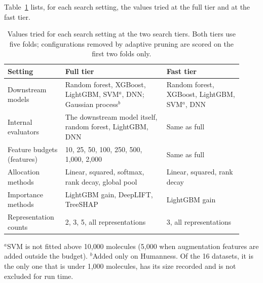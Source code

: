 Table~\ref{tab:search_tiers} lists, for each search setting, the values tried at the full tier and at the fast tier.

\begin{table}[htbp]
\centering
\caption{Values tried for each search setting at the two search tiers. Both tiers use five folds; configurations removed by adaptive pruning are scored on the first two folds only.}
\label{tab:search_tiers}
\begin{tabular}{@{}p{0.22\linewidth}p{0.40\linewidth}p{0.30\linewidth}@{}}
\toprule
Setting & Full tier & Fast tier \\
\midrule
Downstream models & Random forest, XGBoost, LightGBM, SVM$^{a}$, DNN; Gaussian process$^{b}$ & Random forest, XGBoost, LightGBM, SVM$^{a}$, DNN \\
Internal evaluators & The downstream model itself, random forest, LightGBM, DNN & Same as full \\
Feature budgets (features) & 10, 25, 50, 100, 250, 500, 1{,}000, 2{,}000 & Same as full \\
Allocation methods & Linear, squared, softmax, rank decay, global pool & Linear, squared, rank decay \\
Importance methods & LightGBM gain, DeepLIFT, TreeSHAP & LightGBM gain \\
Representation counts & 2, 3, 5, all representations & 3, all representations \\
\bottomrule
\end{tabular}

\smallskip
{\footnotesize $^{a}$SVM is not fitted above 10{,}000 molecules (5{,}000 when augmentation features are added outside the budget). $^{b}$Added only on Humanness. Of the 16 datasets, it is the only one that is under 1{,}000 molecules, has its size recorded and is not excluded for run time.}
\end{table}


